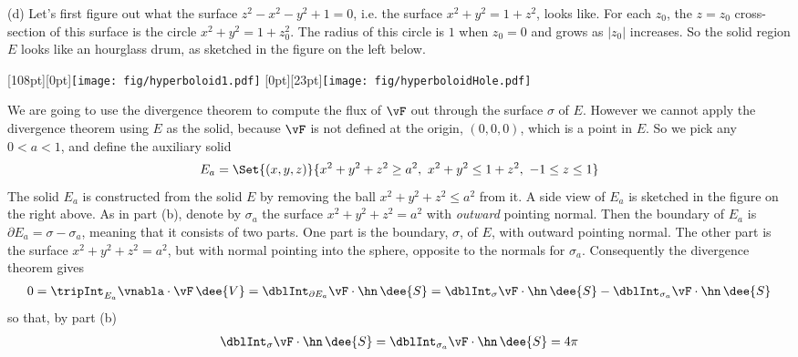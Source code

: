 \begin{solution}
\noindent (d)
Let's first figure out what the surface $z^2 - x^2 - y^2 + 1 = 0$,
i.e. the surface $x^2 + y^2 = 1 +z^2$, looks like. For each $z_0$, the
$z=z_0$ cross-section of this surface is the circle $x^2+y^2=1+z_0^2$.
The radius of this circle is $1$ when $z_0=0$ and grows as $|z_0|$
increases. So the solid region $E$ looks like an hourglass drum, as sketched
in the figure on the left below.

\begin{center}
  \raisebox{-8pt}[108pt][0pt]{\texttt{[image: fig/hyperboloid1.pdf]}}
       \qquad\qquad
       \raisebox{-25pt}[0pt][23pt]{\texttt{[image: fig/hyperboloidHole.pdf]}}
\end{center}

We are going to use the divergence theorem to compute the flux of $\vF$
out through the surface $\sigma$ of $E$. However we cannot apply the
divergence theorem using $E$ as the solid, because $\vF$ is not defined
at the origin, $(0,0,0)$, which is a point in $E$. So we pick any 
$0<a<1$, and define the auxiliary solid
\begin{equation*}
E_a = \Set{(x,y,z)}{ x^2+y^2+z^2\ge a^2,\ 
                    x^2+y^2\le 1+z^2,\ 
                    -1\le z\le 1}
\end{equation*}
The solid $E_a$ is constructed from the solid $E$ by removing 
the ball $x^2+y^2+z^2\le a^2$ from it. A side view of $E_a$ is sketched 
in the figure on the right above. As in part (b), denote by $\sigma_a$
the surface $x^2+y^2+z^2=a^2$ with \emph{outward} pointing normal.
Then the boundary of $E_a$ is $\partial E_a=\sigma-\sigma_a$, meaning that 
it consists of two parts. One part is the boundary, $\sigma$, of $E$,
with outward pointing normal. The other part is the surface 
$x^2+y^2+z^2=a^2$, but with normal pointing into the sphere, opposite to the
normals for $\sigma_a$. Consequently the divergence theorem gives
\begin{align*}
0=\tripInt_{E_a} \vnabla \cdot \vF\,\dee{V}
 =\dblInt_{\partial E_a} \vF\cdot\hn\,\dee{S}
 = \dblInt_{\sigma} \vF\cdot\hn\,\dee{S}
      -\dblInt_{\sigma_a} \vF\cdot\hn\,\dee{S}
\end{align*}
so that, by part (b)
\begin{align*}
\dblInt_{\sigma} \vF\cdot\hn\,\dee{S}
=\dblInt_{\sigma_a} \vF\cdot\hn\,\dee{S}
=4\pi
\end{align*}


\end{solution}

